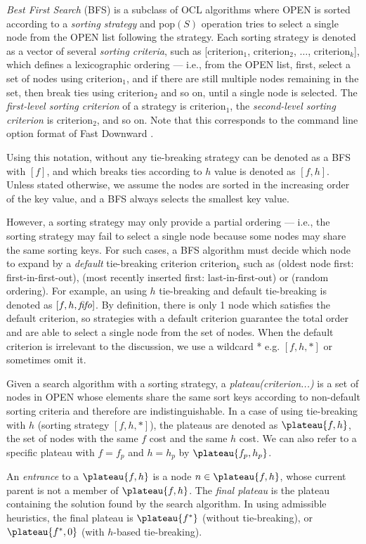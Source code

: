 \emph{Best First Search} (BFS) is a subclass of OCL algorithms where OPEN is sorted according to a \emph{sorting strategy} and pop$(S)$ operation tries to select a single node from the OPEN list following the strategy.
Each sorting strategy is denoted as a vector of several \emph{sorting criteria}, such as
[$\text{criterion}_1$, $\text{criterion}_2$, $\ldots$,
$\text{criterion}_k$], which defines a lexicographic ordering ---
i.e., from the OPEN list, first, select a
set of nodes using $\text{criterion}_1$, and if there are still multiple
nodes remaining in the set, then break ties using $\text{criterion}_2$
and so on, until a single node is selected.  The \emph{first-level
sorting criterion} of a strategy is $\text{criterion}_1$, the
\emph{second-level sorting criterion} is $\text{criterion}_2$, and so on.
Note that this corresponds to the command line option format of Fast
Downward \cite{Helmert2006}.

Using this notation, \astar without any tie-breaking strategy can be
denoted as a BFS with $[f]$, and \astar which breaks ties according to $h$
value is denoted as $[f,h]$.
Unless stated otherwise, we assume the nodes are sorted in the
increasing order of the key value, and a BFS always selects the smallest
key value.

However, a sorting strategy may only provide a partial ordering ---
i.e., the sorting strategy may fail to select a single node because some nodes
may share the same sorting keys.
For such cases, a BFS algorithm must
decide which node to expand by a \emph{default} tie-breaking
criterion $\text{criterion}_k$ such as  \fifo (oldest node first: first-in-first-out), \lifo
(most recently inserted first: last-in-first-out) or \ro (random ordering).
For example, an \astar using $h$ tie-breaking and \fifo default tie-breaking
 is denoted as $[f,h,{\text{\textit{fifo}}}]$.
By definition, there is only 1 node which satisfies the default criterion, so
strategies with a default criterion guarantee the total order and
are able to select a single node from the set of nodes.
When the default criterion is irrelevant to the discussion,
we use a wildcard * e.g. $[f,h,*]$ or sometimes omit it.

Given a search algorithm with a sorting strategy, 
a \emph{plateau(criterion...)} is a set of nodes in OPEN whose elements share
the same sort keys according to non-default sorting criteria and therefore
are indistinguishable. In a case of \astar
using tie-breaking with $h$ (sorting strategy $[f,h,*]$), the plateaus are denoted as
$\plateau{f,h}$, the set of nodes with the same $f$ cost and the same $h$ cost.
We can also refer to a specific plateau with $f=f_p$ and $h=h_p$ by $\plateau{f_p,h_p}$.

An \emph{entrance} to a $\plateau{f,h}$ is a node $n \in
\plateau{f,h}$, whose current parent is not a member of
$\plateau{f,h}$.  The \emph{final plateau} is the plateau
containing the solution found by the search algorithm.  In \astar using
admissible heuristics, the final plateau is $\plateau{f^*}$ (without
tie-breaking), or $\plateau{f^*,0}$ (with $h$-based tie-breaking).
